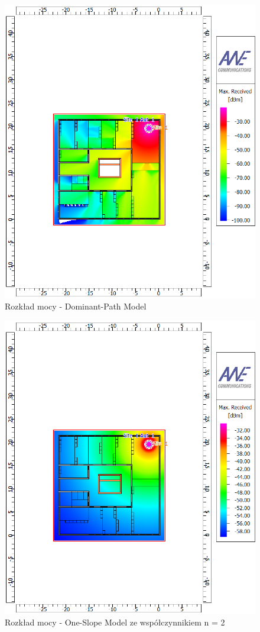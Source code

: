 \documentclass[12pt, a4paper, oneside]{article}
\begin{document}
\begin{figure}[h]
\centering
\caption{Rozkład mocy - Dominant-Path Model}
\includegraphics[scale=0.65]{DPM_RECEIVED.png}
\end{figure}
\begin{figure}[h]
\centering
\caption{Rozkład mocy - One-Slope Model ze współczynnikiem n = 2}
\includegraphics[scale=0.65]{ONE_SLOPE_RECEIVED_EXP_2.png}
\end{figure}
\end{document}
